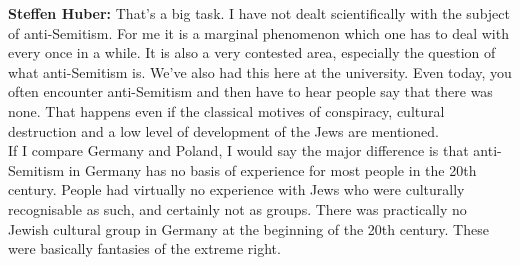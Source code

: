 \textbf{Steffen Huber:} That's a big task. I have not dealt scientifically with the subject of anti-Semitism. For me it is a marginal phenomenon which one has to deal with every once in a while. It is also a very contested area, especially the question of what anti-Semitism is. We’ve also had this here at the university. Even today, you often encounter anti-Semitism and then have to hear people say that there was none. That happens even if the classical motives of conspiracy, cultural destruction and a low level of development of the Jews are mentioned. \\
If I compare Germany and Poland, I would say the major difference is that anti-Semitism in Germany has no basis of experience for most people in the 20th century. People had virtually no experience with Jews who were culturally recognisable as such, and certainly not as groups. There was practically no Jewish cultural group in Germany at the beginning of the 20th century. These were basically fantasies of the extreme right.\\
